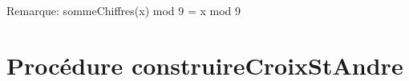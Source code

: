 \documentclass{article}
\begin{document}
		\subsection{}
			
		\subsection{}
			
		\subsection{}
			
		\subsection{}
			
			Remarque: sommeChiffres(x) mod 9 = x mod 9
	\section{Procédure construireCroixStAndre}
		\subsection{}
			
		\subsection{}
			
\end{document}
